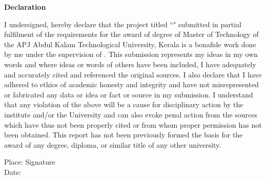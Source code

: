 \begin{titlepage}
 
 \parbox[2in]{4in}{}

\begin{center}
\textbf{\Large Declaration}
\end{center}

\vspace{1cm} 
 
\onehalfspacing
	
	 I undersigned, hereby declare that the project titled ``{\titl}" submitted in partial fulfilment of the requirements for the award of degree of Master of Technology of the APJ Abdul Kalam  Technological University, Kerala is a bonafide  work done by me under the supervision of \guide. This submission represents my ideas in my own words and where ideas or words of others have been included, I have adequately and accurately cited and referenced the original sources. I also declare that I have adhered to ethics of academic honesty and integrity and have not misrepresented or fabricated any data or idea or fact or source in my submission. I understand that any violation of the above will be a cause for disciplinary action by the institute and/or the University and can also evoke penal action from the sources which have thus not been  properly cited or from whom proper permission has not been obtained. This report has not been previously formed the basis for the award of any degree, diploma, or similar title of any other university.
	

 \vspace{1cm}
\begin{flushright}
Place: \hfill Signature\\
Date: \hfill {\sname}
\end{flushright} 

\end{titlepage}